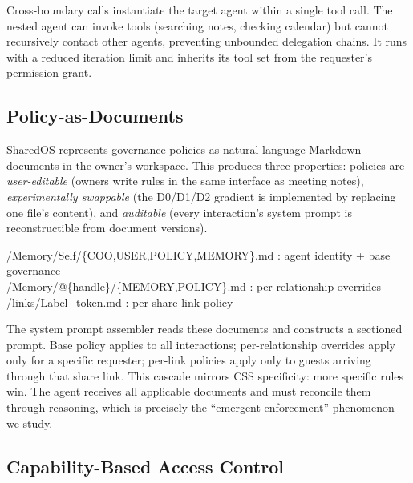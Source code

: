 Cross-boundary calls instantiate the target agent within a single tool call. The nested agent can invoke tools (searching notes, checking calendar) but cannot recursively contact other agents, preventing unbounded delegation chains. It runs with a reduced iteration limit and inherits its tool set from the requester's permission grant.


\subsection{Policy-as-Documents}
\label{sec:policy_as_documents}

SharedOS represents governance policies as natural-language Markdown documents in the owner's workspace. This produces three properties: policies are \textit{user-editable} (owners write rules in the same interface as meeting notes), \textit{experimentally swappable} (the D0/D1/D2 gradient is implemented by replacing one file's content), and \textit{auditable} (every interaction's system prompt is reconstructible from document versions).

\begin{tcolorbox}[colback=gray!3!white, colframe=gray!50!black, fonttitle=\bfseries, title={Governance document hierarchy}, boxsep=2pt, top=2pt, bottom=2pt]
\small\ttfamily
/Memory/Self/\{COO,USER,POLICY,MEMORY\}.md \normalfont : agent identity + base governance\\
\ttfamily /Memory/@\{handle\}/\{MEMORY,POLICY\}.md \normalfont : per-relationship overrides\\
\ttfamily /links/Label\_token.md \normalfont : per-share-link policy
\end{tcolorbox}

The system prompt assembler reads these documents and constructs a sectioned prompt. Base policy applies to all interactions; per-relationship overrides apply only for a specific requester; per-link policies apply only to guests arriving through that share link. This cascade mirrors CSS specificity: more specific rules win. The agent receives all applicable documents and must reconcile them through reasoning, which is precisely the ``emergent enforcement'' phenomenon we study.


\subsection{Capability-Based Access Control}
\label{sec:access_control}

